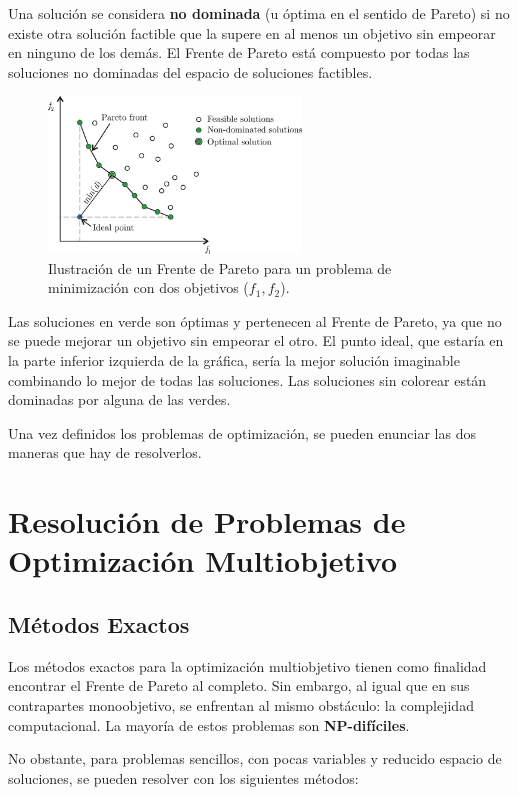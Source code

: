 \documentclass[12pt,a4paper]{book}
\begin{document}
Una solución se considera \textbf{no dominada} (u óptima en el sentido de Pareto) si no existe otra solución factible que la supere en al menos un objetivo sin empeorar en ninguno de los demás. El Frente de Pareto está compuesto por todas las soluciones no dominadas del espacio de soluciones factibles.
\begin{figure}[H]
    \centering
    \includegraphics[width=0.6\textwidth]{images/pareto_front.png}
    \caption{\citep{Bre2017} Ilustración de un Frente de Pareto para un problema de minimización con dos objetivos ($f_1, f_2$).}
    \label{fig:pareto}
\end{figure}
Las soluciones en verde son óptimas y pertenecen al Frente de Pareto, ya que no se puede mejorar un objetivo sin empeorar el otro. El punto ideal, que estaría en la parte inferior izquierda de la gráfica, sería la mejor solución imaginable combinando lo mejor de todas las soluciones. Las soluciones sin colorear están dominadas por alguna de las verdes.

Una vez definidos los problemas de optimización, se pueden enunciar las dos maneras que hay de resolverlos.

\section{Resolución de Problemas de Optimización Multiobjetivo}

\subsection{Métodos Exactos}

Los métodos exactos para la optimización multiobjetivo tienen como finalidad encontrar el Frente de Pareto al completo. Sin embargo, al igual que en sus contrapartes monoobjetivo, se enfrentan al mismo obstáculo: la complejidad computacional. La mayoría de estos problemas son \textbf{NP-difíciles}.

No obstante, para problemas sencillos, con pocas variables y reducido espacio de soluciones, se pueden resolver con los siguientes métodos:
\end{document}
